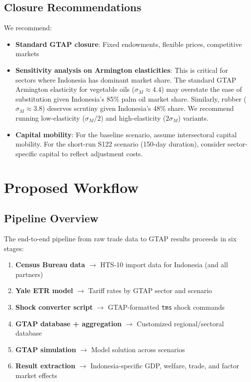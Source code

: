\documentclass[12pt,a4paper]{article}
\begin{document}
\subsection{Closure Recommendations}

We recommend:
\begin{itemize}
    \item \textbf{Standard GTAP closure}: Fixed endowments, flexible prices, competitive markets
    \item \textbf{Sensitivity analysis on Armington elasticities}: This is critical for sectors where Indonesia has dominant market share. The standard GTAP Armington elasticity for vegetable oils ($\sigma_M \approx 4.4$) may overstate the ease of substitution given Indonesia's 85\% palm oil market share. Similarly, rubber ($\sigma_M \approx 3.8$) deserves scrutiny given Indonesia's 48\% share. We recommend running low-elasticity ($\sigma_M / 2$) and high-elasticity ($2\sigma_M$) variants.
    \item \textbf{Capital mobility}: For the baseline scenario, assume intersectoral capital mobility. For the short-run S122 scenario (150-day duration), consider sector-specific capital to reflect adjustment costs.
\end{itemize}

\section{Proposed Workflow}
\label{sec:workflow}

\subsection{Pipeline Overview}

The end-to-end pipeline from raw trade data to GTAP results proceeds in six stages:

\begin{enumerate}
    \item \textbf{Census Bureau data} $\rightarrow$ HTS-10 import data for Indonesia (and all partners)
    \item \textbf{Yale ETR model} $\rightarrow$ Tariff rates by GTAP sector and scenario
    \item \textbf{Shock converter script} $\rightarrow$ GTAP-formatted \texttt{tms} shock commands
    \item \textbf{GTAP database + aggregation} $\rightarrow$ Customized regional/sectoral database
    \item \textbf{GTAP simulation} $\rightarrow$ Model solution across scenarios
    \item \textbf{Result extraction} $\rightarrow$ Indonesia-specific GDP, welfare, trade, and factor market effects
\end{enumerate}
\end{document}
